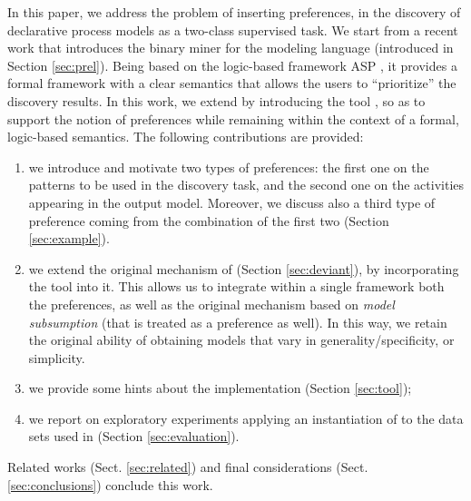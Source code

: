 In this paper, we address the problem of inserting  preferences,  in the discovery of declarative process models as a two-class supervised task. We start from a recent work \cite{deviant-tkde} that introduces the \nd binary miner for the \declare modeling language \cite{DBLP:conf/edoc/PesicSA07} (introduced in Section \ref{sec:prel}). Being \nd based on the logic-based framework ASP \cite{asp-intro}, it provides a formal framework with a clear semantics that allows the users to ``prioritize'' the discovery results. In this work, we extend \nd by introducing the \asprin tool \cite{DBLP:conf/aaai/BrewkaD0S15}, so as to support the notion of  preferences while remaining within the context of a formal, logic-based semantics. The following contributions are provided:
%
\begin{enumerate}[{(i)}]
    \item we introduce and motivate two types of  preferences: the first one on the \declare patterns to be used in the discovery task, and the second one on the activities appearing in the output model. Moreover, we discuss also a third type of preference coming from the combination of the first two (Section \ref{sec:example}).
	\item we extend the original mechanism of \nd (Section \ref{sec:deviant}), by incorporating the \asprin tool \cite{DBLP:conf/aaai/BrewkaD0S15} into it. This allows us to integrate within a single framework both the  preferences, as well as the original \nd mechanism based on \emph{model subsumption} (that is treated as a preference as well). In this way, we retain the original ability of obtaining models that vary in generality/specificity, or simplicity.
	\item we provide some hints about the implementation (Section \ref{sec:tool});   
	\item we report on exploratory experiments applying an instantiation of \nd  to the data sets used in \cite{2007b-Lamma,DBLP:conf/bpm/SlaatsDB21} (Section \ref{sec:evaluation}).
\end{enumerate}
Related works (Sect. \ref{sec:related}) and final considerations (Sect. \ref{sec:conclusions}) conclude this work.

